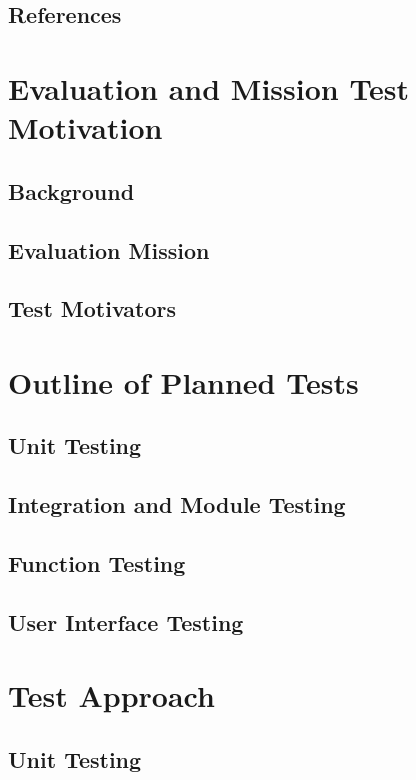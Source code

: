 \documentclass{scrreprt}
\begin{document}
\section{References}

\chapter{Evaluation and Mission Test Motivation}

\section{Background}

\section{Evaluation Mission}

\section{Test Motivators}

\chapter{Outline of Planned Tests}

\section{Unit Testing}

\section{Integration and Module Testing}

\section{Function Testing}

\section{User Interface Testing}

\chapter{Test Approach}

\section{Unit Testing}
\end{document}
